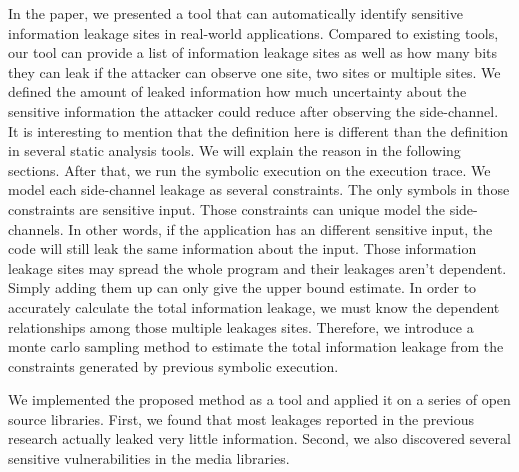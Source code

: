 In the paper, we presented a tool that can automatically identify sensitive information 
leakage sites in real-world applications. Compared to existing tools, our tool can provide
a list of information leakage sites as well as how many bits they can leak if the attacker
can observe one site, two sites or multiple sites. We defined the amount of leaked information 
how much uncertainty about the sensitive information the attacker could reduce after observing 
the side-channel. It is interesting to mention that the definition here is different than the 
definition in several static analysis tools. We will explain the reason in the following 
sections. After that, we run the symbolic execution on the execution trace. We model each 
side-channel leakage as several constraints. The only symbols in those constraints are 
sensitive input. Those constraints can unique model the side-channels. In other words, 
if the application has an different sensitive input, the code will still leak the same 
information about the input.  Those information leakage sites may spread the whole program 
and their leakages aren’t dependent. Simply adding them up can only give the upper bound 
estimate. In order to accurately calculate the total information leakage, we must know the 
dependent relationships among those multiple leakages sites. Therefore, we introduce a 
monte carlo sampling method to estimate the total information leakage from the constraints 
generated by previous symbolic execution. 

We implemented the proposed method as a tool and applied it on a series of open source libraries. 
First, we found that most leakages reported in the previous research actually leaked very little
 information. Second, we also discovered several sensitive vulnerabilities in the media libraries. 
